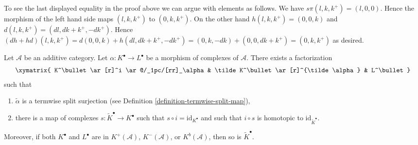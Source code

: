 \begin{remark}
\label{remark-compute-modules}
To see the last displayed equality in the proof above we can argue
with elements as follows. We have
$s\pi(l, k, k^{+}) = (l, 0, 0)$.
Hence the morphism of the left hand side maps
$(l, k, k^{+})$ to $(0, k, k^{+})$.
On the other hand $h(l, k, k^{+}) = (0, 0, k)$ and
$d(l, k, k^{+}) = (dl, dk + k^{+}, -dk^{+})$.
Hence $(dh + hd)(l, k, k^{+}) =
d(0, 0, k) + h(dl, dk + k^{+}, -dk^{+}) =
(0, k, -dk) + (0, 0, dk + k^{+}) = (0, k, k^{+})$
as desired.
\end{remark}

\begin{lemma}
\label{lemma-make-surjective}
Let $\mathcal{A}$ be an additive category.
Let $\alpha : K^\bullet \to L^\bullet$ be a morphism
of complexes of $\mathcal{A}$.
There exists a factorization
$$
\xymatrix{
K^\bullet \ar[r]^i \ar@/_1pc/[rr]_\alpha &
\tilde K^\bullet \ar[r]^{\tilde \alpha} &
L^\bullet
}
$$
such that
\begin{enumerate}
\item $\tilde \alpha$ is a termwise split surjection (see
Definition \ref{definition-termwise-split-map}),
\item there is a map of complexes $s : \tilde K^\bullet \to K^\bullet$
such that $s \circ i = \text{id}_{K^\bullet}$ and such that
$i \circ s$ is homotopic to $\text{id}_{\tilde K^\bullet}$.
\end{enumerate}
Moreover, if both $K^\bullet$ and $L^\bullet$ are in
$K^{+}(\mathcal{A})$, $K^{-}(\mathcal{A})$, or $K^b(\mathcal{A})$,
then so is $\tilde K^\bullet$.
\end{lemma}

